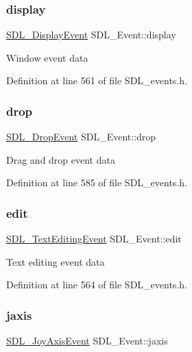\subsubsection{\texorpdfstring{display}{display}}
{\footnotesize\ttfamily \mbox{\hyperlink{struct_s_d_l___display_event}{S\+D\+L\+\_\+\+Display\+Event}} S\+D\+L\+\_\+\+Event\+::display}

Window event data 

Definition at line 561 of file S\+D\+L\+\_\+events.\+h.

\mbox{\label{union_s_d_l___event_acff77bccbca65abbb876360a3f5209c9}} 
\subsubsection{\texorpdfstring{drop}{drop}}
{\footnotesize\ttfamily \mbox{\hyperlink{struct_s_d_l___drop_event}{S\+D\+L\+\_\+\+Drop\+Event}} S\+D\+L\+\_\+\+Event\+::drop}

Drag and drop event data 

Definition at line 585 of file S\+D\+L\+\_\+events.\+h.

\mbox{\label{union_s_d_l___event_a9a7e3b67b2654d4c5fc509676c6a7183}} 
\subsubsection{\texorpdfstring{edit}{edit}}
{\footnotesize\ttfamily \mbox{\hyperlink{struct_s_d_l___text_editing_event}{S\+D\+L\+\_\+\+Text\+Editing\+Event}} S\+D\+L\+\_\+\+Event\+::edit}

Text editing event data 

Definition at line 564 of file S\+D\+L\+\_\+events.\+h.

\mbox{\label{union_s_d_l___event_ac4611acd0e9c675e67dc20919f0accb4}} 
\subsubsection{\texorpdfstring{jaxis}{jaxis}}
{\footnotesize\ttfamily \mbox{\hyperlink{struct_s_d_l___joy_axis_event}{S\+D\+L\+\_\+\+Joy\+Axis\+Event}} S\+D\+L\+\_\+\+Event\+::jaxis}

